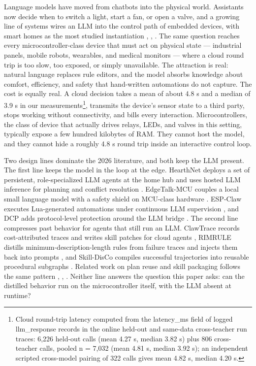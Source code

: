 \documentclass[11pt,a4paper]{article}
\begin{document}
Language models have moved from chatbots into the physical world. Assistants
now decide when to switch a light, start a fan, or open a valve, and a growing
line of systems wires an LLM into the control path of embedded devices, with
smart homes as the most studied instantiation \cite{1}, \cite{2}, \cite{3}.
The same question reaches every microcontroller-class device that must act on
physical state --- industrial panels, mobile robots, wearables, and medical
monitors --- where a cloud round trip is too slow, too exposed, or simply
unavailable.
The attraction is real: natural language replaces rule editors, and the model
absorbs knowledge about comfort, efficiency, and safety that hand-written
automations do not capture. The cost is equally real. A cloud decision takes
a mean of about 4.8 s and a median of 3.9 s in our
measurements\footnote{Cloud round-trip latency computed from the latency\_ms
field of logged llm\_response records in the online held-out and same-data
cross-teacher run traces: 6,226 held-out calls (mean 4.27 s, median 3.82 s)
plus 806 cross-teacher calls, pooled n = 7,032 (mean 4.81 s, median
3.92 s); an independent scripted cross-model pairing of 322 calls gives mean
4.82 s, median 4.20 s.}, transmits the device's sensor state to a third
party, stops working without connectivity, and bills every interaction.
Microcontrollers, the class of device that actually drives
relays, LEDs, and valves in this setting, typically expose a few hundred
kilobytes of RAM. They cannot host the model, and they cannot hide a roughly
4.8 s round trip inside an interactive control loop.

Two design lines dominate the 2026 literature, and both keep the LLM present.
The first line keeps the model in the loop at the edge. HearthNet deploys a
set of persistent, role-specialized LLM agents at the home hub and uses hosted
LLM inference for planning and conflict resolution \cite{1}. EdgeTalk-MCU
couples a local small language model with a safety shield on MCU-class
hardware \cite{2}. ESP-Claw executes Lua-generated automations under
continuous LLM supervision \cite{3}, and DCP adds protocol-level protection
around the LLM bridge \cite{4}. The second line compresses past behavior for
agents that still run an LLM. ClawTrace records cost-attributed traces and
writes skill patches for cloud agents \cite{5}, RIMRULE distills
minimum-description-length rules from failure traces and injects them back
into prompts \cite{6}, and Skill-DisCo compiles successful trajectories into
reusable procedural subgraphs \cite{7}. Related work on plan reuse and skill
packaging follows the same pattern \cite{8}, \cite{9}, \cite{10}. Neither line
answers the question this paper asks: can the distilled behavior run on the
microcontroller itself, with the LLM absent at runtime?
\end{document}
